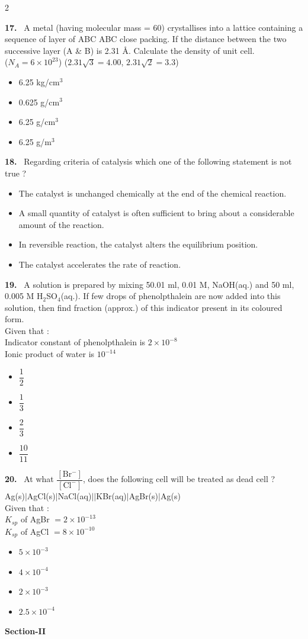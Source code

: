 \documentclass[10pt]{extarticle}
\newcommand{\sect}[1]{\par\smallskip\noindent\textbf{#1}\par}
\newcommand{\qn}[1]{\par\smallskip\noindent\textbf{#1.}~}
\newenvironment{qoptions}{\begin{itemize}[leftmargin=1.8em,itemsep=1pt,topsep=2pt,label={}]}{\end{itemize}}
\newcommand{\opt}[2]{\item[(#1)] #2}
\begin{document}
\begin{multicols}{2}
\qn{17} A metal (having molecular mass = 60) crystallises into a lattice containing a sequence of layer of ABC ABC close packing. If the distance between the two successive layer (A \& B) is 2.31 \AA. Calculate the density of unit cell.\\
($N_A=6\times10^{23}$) ($2.31\sqrt{3}=4.00$, $2.31\sqrt{2}=3.3$)
\begin{qoptions}
\opt{A}{6.25 kg/cm$^3$}
\opt{B}{0.625 g/cm$^3$}
\opt{C}{6.25 g/cm$^3$}
\opt{D}{6.25 g/m$^3$}
\end{qoptions}

\qn{18} Regarding criteria of catalysis which one of the following statement is not true ?
\begin{qoptions}
\opt{A}{The catalyst is unchanged chemically at the end of the chemical reaction.}
\opt{B}{A small quantity of catalyst is often sufficient to bring about a considerable amount of the reaction.}
\opt{C}{In reversible reaction, the catalyst alters the equilibrium position.}
\opt{D}{The catalyst accelerates the rate of reaction.}
\end{qoptions}

\qn{19} A solution is prepared by mixing 50.01 ml, 0.01 M, NaOH(aq.) and 50 ml, 0.005 M H$_2$SO$_4$(aq.). If few drops of phenolpthalein are now added into this solution, then find fraction (approx.) of this indicator present in its coloured form.\\
Given that :\\
Indicator constant of phenolpthalein is $2\times10^{-8}$\\
Ionic product of water is $10^{-14}$
\begin{qoptions}
\opt{A}{$\dfrac{1}{2}$}
\opt{B}{$\dfrac{1}{3}$}
\opt{C}{$\dfrac{2}{3}$}
\opt{D}{$\dfrac{10}{11}$}
\end{qoptions}

\qn{20} At what $\dfrac{[\mathrm{Br^-}]}{[\mathrm{Cl^-}]}$, does the following cell will be treated as dead cell ?\\
Ag(s)$|$AgCl(s)$|$NaCl(aq)$||$KBr(aq)$|$AgBr(s)$|$Ag(s)\\
Given that :\\
$K_{sp}$ of AgBr $=2\times10^{-13}$\\
$K_{sp}$ of AgCl $=8\times10^{-10}$
\begin{qoptions}
\opt{A}{$5\times10^{-3}$}
\opt{B}{$4\times10^{-4}$}
\opt{C}{$2\times10^{-3}$}
\opt{D}{$2.5\times10^{-4}$}
\end{qoptions}

\sect{Section-II}


\end{multicols}
\end{document}
